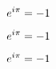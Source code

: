 \documentclass{article}
\begin{document}
\tableofequations


\begin{equation}
  \label{eq:1}
  e^{i\pi}=-1
  \eqcaption{Euler's Equation}
\end{equation}

\begin{equation}
  \label{eq:2}
  e^{i\pi}=-1
  \eqcaption{Euler's Equation, again}
\end{equation}

\newpage
\begin{equation}
  \label{eq:3}
  e^{i\pi}=-1
  \eqcaption{Euler's Equation, yet again}
\end{equation}
\end{document}
